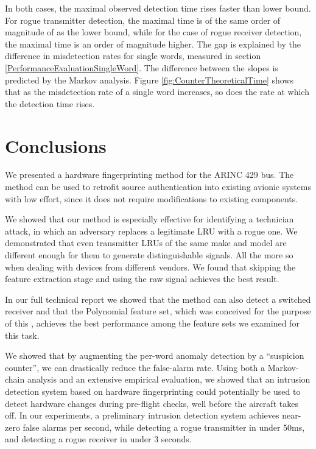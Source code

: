 \documentclass[english]{llncs}
\newcommand{\level}[1]{\section{#1}}
\newcommand{\level}[1]{\chapter{#1}}
\begin{document}
  In both cases, the maximal observed detection time rises faster than lower bound. For rogue transmitter detection, the maximal time is of the same order of magnitude of as the lower bound, while for the case of rogue receiver detection, the maximal time is an order of magnitude higher. The gap is explained by the difference in misdetection rates for single words, measured in section \ref{PerformanceEvaluationSingleWord}. The difference between the slopes is predicted by the Markov analysis. Figure \ref{fig:CounterTheoreticalTime} shows that as the misdetection rate of a single word increases, so does the rate at which the detection time rises.

\vspace*{-1ex}    
\level{Conclusions} \label{Conclusions}
  We presented a hardware fingerprinting method for the ARINC 429 bus.
  The method can be used to retrofit source authentication into existing avionic systems with low effort, since it does not require modifications to existing components.
  
  We showed that our method is especially effective for identifying a technician attack, in which an adversary replaces a legitimate LRU with a rogue one.
  We demonstrated that even transmitter LRUs of the same make and model are different enough for them to generate distinguishable signals.
  All the more so when dealing with devices from different vendors.
  We found that skipping the feature extraction stage and using the raw signal achieves the best result.
  
  In our full technical report \cite{gilboa-markevich2020hardware} we showed that the method can also detect a switched receiver and that the Polynomial feature set, which was conceived for the purpose of this \iftoggle{paper} {paper} {work}, achieves the best performance among the feature sets we examined for this task.

  We showed that by augmenting the per-word anomaly detection by a ``suspicion counter'', we can drastically reduce the false-alarm rate.
  Using both a Markov-chain analysis and an extensive empirical evaluation, we showed that an intrusion detection system based on hardware fingerprinting could potentially be used to detect hardware changes during pre-flight checks, well before the aircraft takes off. In our experiments, a preliminary intrusion detection system achieves near-zero false alarms per second, while detecting a rogue transmitter in under 50ms, and detecting a rogue receiver in under 3 seconds.
  
\end{document}

